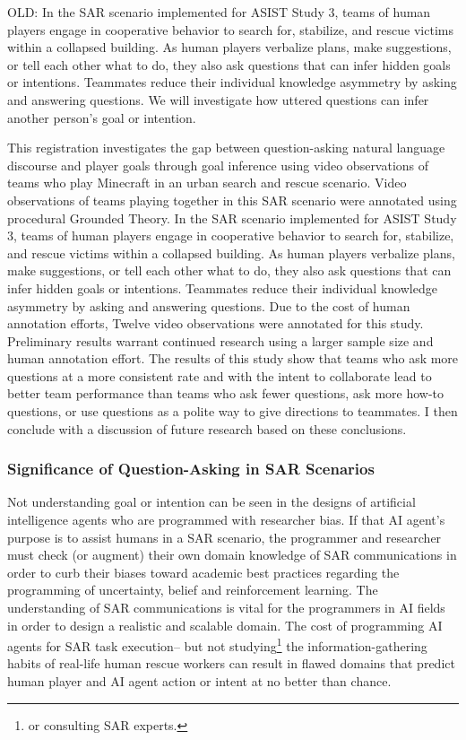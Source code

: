 OLD: In the SAR scenario implemented for ASIST Study 3, teams of human players
engage in cooperative behavior to search for, stabilize, and rescue victims
within a collapsed building. As human players verbalize plans, make
suggestions, or tell each other what to do, they also ask questions that can
infer hidden goals or intentions. Teammates reduce their individual knowledge
asymmetry by asking and answering questions.  We will investigate how uttered
questions can infer another person's goal or intention. 



This registration investigates the gap between question-asking natural language discourse and player goals through goal inference using video observations of teams who play Minecraft in an urban search and rescue scenario. Video observations of teams playing together in this SAR scenario were annotated using procedural Grounded Theory. In the SAR scenario implemented for ASIST Study 3, teams of human players
engage in cooperative behavior to search for, stabilize, and rescue victims
within a collapsed building. As human players verbalize plans, make
suggestions, or tell each other what to do, they also ask questions that can
infer hidden goals or intentions. Teammates reduce their individual knowledge
asymmetry by asking and answering questions. Due to the cost of human annotation efforts, Twelve video observations were annotated for this study. Preliminary results warrant continued research using a larger sample size and human annotation effort. The results of this study show that teams who ask more questions at a more consistent rate and with the intent to collaborate lead to better team performance than teams who ask fewer questions, ask more how-to questions, or use questions as a polite way to give directions to teammates. I then conclude with a discussion of future research based on these conclusions. 

\subsubsection{Significance of Question-Asking in SAR Scenarios}
Not understanding goal or intention can be seen in the designs of artificial intelligence agents who are programmed with researcher bias. If that AI agent's purpose is to assist humans in a SAR scenario, the programmer and researcher must check (or augment) their own domain knowledge of SAR communications in order to curb their biases toward academic best practices regarding the programming of uncertainty, belief and reinforcement learning. The understanding of SAR communications is vital for the programmers in AI fields in order to design a realistic and scalable domain. The cost of programming AI agents for SAR task execution-- but not studying\footnote{or consulting SAR experts.} the information-gathering habits of real-life human rescue workers can result in flawed domains that predict human player and AI agent action or intent at no better than chance. 

